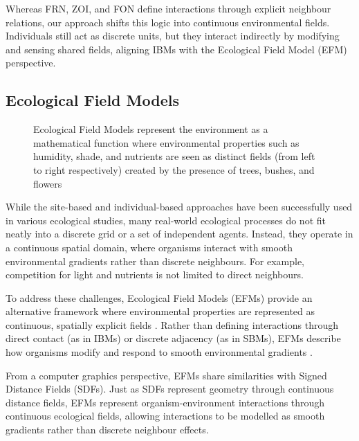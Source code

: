 \midConclusion 

Whereas FRN, ZOI, and FON define interactions through explicit neighbour relations, our approach shifts this logic into continuous environmental fields. Individuals still act as discrete units, but they interact indirectly by modifying and sensing shared fields, aligning IBMs with the Ecological Field Model (EFM) perspective.

\subsection{Ecological Field Models}

\begin{figure}
    \caption{Ecological Field Models represent the environment as a mathematical function where environmental properties such as humidity, shade, and nutrients are seen as distinct fields (from left to right respectively) created by the presence of trees, bushes, and flowers \cite{Wu1985}}
    \label{fig:env-obj-ecological-field-models}
\end{figure}

While the site-based and individual-based approaches have been successfully used in various ecological studies, many real-world ecological processes do not fit neatly into a discrete grid or a set of independent agents. Instead, they operate in a continuous spatial domain, where organisms interact with smooth environmental gradients rather than discrete neighbours. For example, competition for light and nutrients is not limited to direct neighbours.

To address these challenges, Ecological Field Models (EFMs) provide an alternative framework where environmental properties are represented as continuous, spatially explicit fields \cite{Wu1985}. Rather than defining interactions through direct contact (as in IBMs) or discrete adjacency (as in SBMs), EFMs describe how organisms modify and respond to smooth environmental gradients \cite{Chng2011b,Seidl2012}.

From a computer graphics perspective, EFMs share similarities with Signed Distance Fields (SDFs). Just as SDFs represent geometry through continuous distance fields, EFMs represent organism-environment interactions through continuous ecological fields, allowing interactions to be modelled as smooth gradients rather than discrete neighbour effects.


